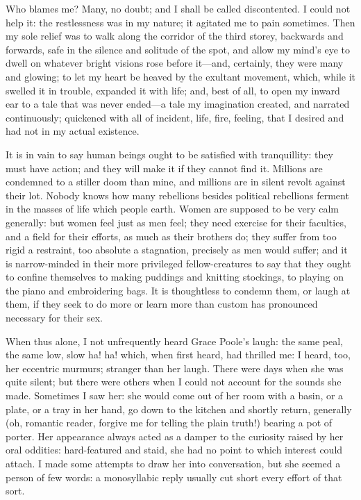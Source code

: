 Who blames me? Many, no doubt; and I shall be called discontented. I
could not help it: the restlessness was in my nature; it agitated me to
pain sometimes. Then my sole relief was to walk along the corridor of
the third storey, backwards and forwards, safe in the silence and
solitude of the spot, and allow my mind's eye to dwell on whatever
bright visions rose before it---and, certainly, they were many and
glowing; to let my heart be heaved by the exultant movement, which,
while it swelled it in trouble, expanded it with life; and, best of all,
to open my inward ear to a tale that was never ended---a tale my
imagination created, and narrated continuously; quickened with all of
incident, life, fire, feeling, that I desired and had not in my actual
existence.

It is in vain to say human beings ought to be satisfied with
tranquillity: they must have action; and they will make it if they
cannot find it. Millions are condemned to a stiller doom than mine, and
millions are in silent revolt against their lot. Nobody knows how many
rebellions besides political rebellions ferment in the masses of life
which people earth. Women are supposed to be very calm generally: but
women feel just as men feel; they need exercise for their faculties, and
a field for their efforts, as much as their brothers do; they suffer
from too rigid a restraint, too absolute a stagnation, precisely as men
would suffer; and it is narrow-minded in their more privileged
fellow-creatures to say that they ought to confine themselves to making
puddings and knitting stockings, to playing on the piano and
embroidering bags. It is thoughtless to condemn them, or laugh at them,
if they seek to do more or learn more than custom has pronounced
necessary for their sex.

When thus alone, I not unfrequently heard Grace Poole's laugh: the same
peal, the same low, slow ha! ha! which, when first heard, had thrilled
me: I heard, too, her eccentric murmurs; stranger than her laugh. There
were days when she was quite silent; but there were others when I could
not account for the sounds she made. Sometimes I saw her: she would
come out of her room with a basin, or a plate, or a tray in her hand, go
down to the kitchen and shortly return, generally (oh, romantic reader,
forgive me for telling the plain truth!) bearing a pot of porter. Her
appearance always acted as a damper to the curiosity raised by her oral
oddities: hard-featured and staid, she had no point to which interest
could attach. I made some attempts to draw her into conversation, but
she seemed a person of few words: a monosyllabic reply usually cut short
every effort of that sort.

